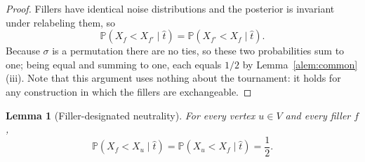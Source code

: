 \documentclass[11pt]{article}
\newtheorem{lemma}{Lemma}
\newcommand{\Prb}{\mathbb{P}}
\begin{document}
\begin{proof}
Fillers have identical noise distributions and the posterior is invariant under relabeling them, so
\begin{equation}
  \Prb(X_f<X_{f'}\mid \hat t)=\Prb(X_{f'}<X_f\mid \hat t).
\end{equation}
Because $\sigma$ is a permutation there are no ties, so these two probabilities sum to one; being equal and summing to one, each equals $1/2$ by Lemma~\ref{alem:common}(iii).  Note that this argument uses nothing about the tournament: it holds for any construction in which the fillers are exchangeable.
\end{proof}

\begin{lemma}[Filler-designated neutrality]\label{lem:fillerdesignated}
For every vertex $u\in V$ and every filler $f$,
\begin{equation}
  \Prb(X_f<X_u\mid \hat t)=\Prb(X_u<X_f\mid \hat t)=\frac12 .
\end{equation}
\end{lemma}
\end{document}
